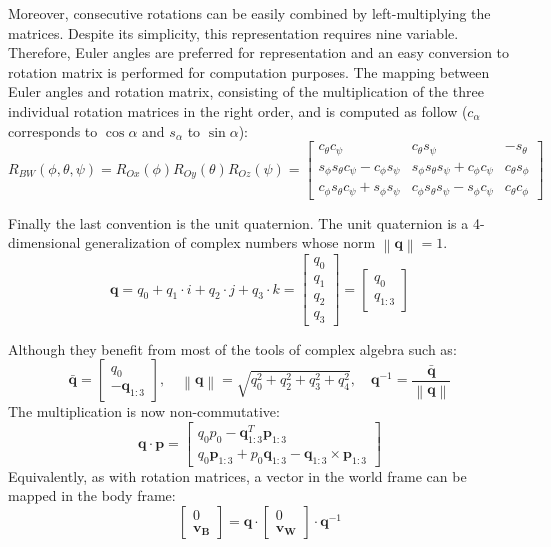\documentclass[a4paper, 12pt]{report}
\newcommand\norm[1]{\left\lVert#1\right\rVert}
\begin{document}
Moreover, consecutive rotations can be easily combined by left-multiplying the matrices. Despite its simplicity, this representation requires nine variable. Therefore, Euler angles are preferred for representation and an easy conversion to rotation matrix is performed for computation purposes. The mapping between Euler angles and rotation matrix, consisting of the multiplication of the three individual rotation matrices in the right order, and is computed as follow ($c_\alpha$ corresponds to $\cos{\alpha}$ and $s_\alpha$ to $\sin{\alpha}$):
\[R_{BW}(\phi, \theta, \psi)= R_{Ox}(\phi) R_{Oy}(\theta) R_{Oz}(\psi)  = 
\begin{bmatrix}  c_\theta c_\psi  & c_\theta s_\psi  & -s_\theta  \\ s_\phi s_\theta c_\psi -c_\phi s_\psi  & s_\phi s_\theta s_\psi  + c_\phi c_\psi  & c_\theta s_\phi  \\ c_\phi s_\theta c_\psi +s_\phi s_\psi  & c_\phi s_\theta s_\psi -s_\phi c_\psi  & c_\theta c_\phi  \end{bmatrix} \]

Finally the last convention is the unit quaternion. The unit quaternion is a 4-dimensional generalization of complex numbers whose norm $\norm{\boldsymbol{q}} = 1$.
\[ \boldsymbol{q} =  q_0 + q_1 \cdot i + q_2 \cdot j + q_3 \cdot k = \begin{bmatrix} q_0 \\ q_1 \\ q_2 \\ q_3 \end{bmatrix} = \begin{bmatrix} q_0 \\ q_{1:3} \end{bmatrix} \]

Although they benefit from most of the tools of complex algebra such as:
\[ \boldsymbol{\bar q} = \begin{bmatrix} q_0 \\ -\boldsymbol{q}_{1:3} \end{bmatrix},  \quad \norm{\boldsymbol{q}} = \sqrt{q_0^2 + q_2^2 + q_3^2 + q_4^2}, \quad \boldsymbol{q}^{-1} = \frac{\boldsymbol{\bar q}}{ \norm{\boldsymbol{q}}} \]
The multiplication is now non-commutative:
\[\boldsymbol{q} \cdot \boldsymbol{p} = \begin{bmatrix} q_0p_0 - \boldsymbol{q}^T_{1:3}\boldsymbol{p}_{1:3} \\ q_0\boldsymbol{p}_{1:3} + p_0\boldsymbol{q}_{1:3} - \boldsymbol{q}_{1:3} \times \boldsymbol{p}_{1:3} \end{bmatrix} \]
Equivalently, as with rotation matrices, a vector in the world frame can be mapped in the body frame:
\[ \begin{bmatrix} 0 \\ \boldsymbol{v_B} \end{bmatrix}  = \boldsymbol{q} \cdot \begin{bmatrix} 0 \\ \boldsymbol{v_W} \end{bmatrix} \cdot \boldsymbol{q}^{-1} \]
\end{document}
